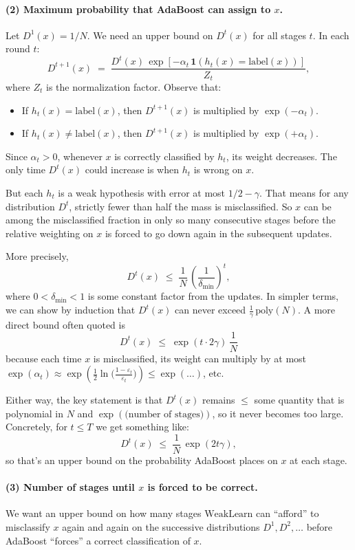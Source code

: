 \documentclass[11pt]{article}
\DeclareMathOperator{\1}{\mathbbm{1}}
\begin{document}
\paragraph{(2) Maximum probability that AdaBoost can assign to $x$.}
Let $D^1(x)=1/N$. We need an upper bound on $D^t(x)$ for all stages $t$.  In each round $t$:
\[
D^{t+1}(x) \;=\; \frac{D^t(x)\,\exp[-\alpha_t\,\mathbf{1}(h_t(x)=\text{label}(x))]}{Z_t},
\]
where $Z_t$ is the normalization factor.  Observe that:
\begin{itemize}
	\item If $h_t(x)=\text{label}(x)$, then $D^{t+1}(x)$ is multiplied by $\exp(-\alpha_t)$.
	\item If $h_t(x)\neq\text{label}(x)$, then $D^{t+1}(x)$ is multiplied by $\exp(+\alpha_t)$.
\end{itemize}
Since $\alpha_t>0$, whenever $x$ is correctly classified by $h_t$, its weight decreases.  The only time $D^t(x)$ could increase is when $h_t$ is wrong on $x$.  

But each $h_t$ is a weak hypothesis with error at most $1/2-\gamma$.  That means for any distribution $D^t$, strictly fewer than half the mass is misclassified.  So $x$ can be among the misclassified fraction in only so many consecutive stages before the relative weighting on $x$ is forced to go down again in the subsequent updates.  

More precisely, 
\[
D^t(x) \;\le\;\frac{1}{N}\,\left(\frac{1}{\delta_\text{min}}\right)^{t},
\]
where $0<\delta_\text{min}<1$ is some constant factor from the updates.  In simpler terms, we can show by induction that $D^t(x)$ can never exceed $\frac{1}{\gamma}\,\text{poly}(N)$.  A more direct bound often quoted is
\[
D^t(x)\;\le\; \exp(t\cdot 2\gamma)\,\frac{1}{N}
\]
because each time $x$ is misclassified, its weight can multiply by at most $\exp(\alpha_t)\approx \exp(\tfrac12\ln\!\bigl(\tfrac{1-\varepsilon_t}{\varepsilon_t}\bigr))\le \exp(\!\dots)$, etc.\

Either way, the key statement is that $D^t(x)$ remains $\leq$ some quantity that is polynomial in $N$ and $\exp(\text{(number of stages)})$, so it never becomes too large.  Concretely, for $t\le T$ we get something like:
\[
D^t(x)\;\le\;\frac{1}{N}\,\exp(2t\gamma),
\]
so that’s an upper bound on the probability AdaBoost places on $x$ at each stage.

\paragraph{(3) Number of stages until $x$ is forced to be correct.}
We want an upper bound on how many stages $\text{WeakLearn}$ can “afford” to misclassify $x$ again and again on the successive distributions $D^1,D^2,\dots$ before AdaBoost “forces” a correct classification of $x$.  
\end{document}
